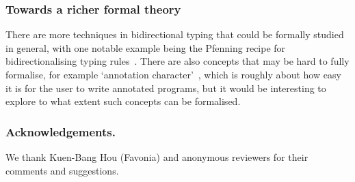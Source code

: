 \subsubsection{Towards a richer formal theory}

There are more techniques in bidirectional typing that could be formally studied in general, with one notable example being the Pfenning recipe for bidirectionalising typing rules~\citep[Section~4]{Dunfield2021}.
There are also concepts that may be hard to fully formalise, for example `annotation character'~\citep[Section~3.4]{Dunfield2021}, which is roughly about how easy it is for the user to write annotated programs, but it would be interesting to explore to what extent such concepts can be formalised.

\begin{credits}
\subsubsection{Acknowledgements.}
We thank Kuen-Bang {Hou (Favonia)} and anonymous reviewers for their comments and suggestions.
\end{credits}
